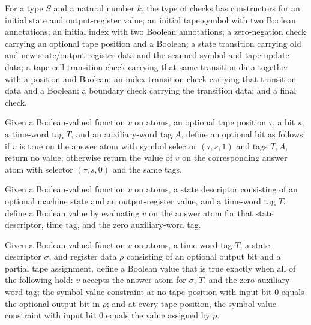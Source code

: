 \begin{definition}
\label{Complexity.Meyer.Check}
\leanok
{}
For a type $S$ and a natural number $k$, the type of checks has constructors for an
initial state and output-register value; an initial tape symbol with two Boolean
annotations; an initial index with two Boolean annotations; a zero-negation check
carrying an optional tape position and a Boolean; a state transition carrying old and
new state/output-register data and the scanned-symbol and tape-update data; a tape-cell
transition check carrying that same transition data together with a position and
Boolean; an index transition check carrying that transition data and a Boolean; a
boundary check carrying the transition data; and a final check.
\end{definition}

\begin{definition}
\label{Complexity.Meyer.symvA}
\leanok
{}
Given a Boolean-valued function $v$ on atoms, an optional tape position $\tau$, a bit
$s$, a time-word tag $T$, and an auxiliary-word tag $A$, define an optional bit as
follows: if $v$ is true on the answer atom with symbol selector $(\tau,s,1)$ and tags
$T,A$, return no value; otherwise return the value of $v$ on the corresponding answer
atom with selector $(\tau,s,0)$ and the same tags.
\end{definition}

\begin{definition}
\label{Complexity.Meyer.stA}
\leanok
{}
Given a Boolean-valued function $v$ on atoms, a state descriptor consisting of an
optional machine state and an output-register value, and a time-word tag $T$, define a
Boolean value by evaluating $v$ on the answer atom for that state descriptor, time tag,
and the zero auxiliary-word tag.
\end{definition}

\begin{definition}
\label{Complexity.Meyer.claims}
\leanok
{}
Given a Boolean-valued function $v$ on atoms, a time-word tag $T$, a state descriptor
$\sigma$, and register data $\rho$ consisting of an optional output bit and a partial
tape assignment, define a Boolean value that is true exactly when all of the following
hold: $v$ accepts the answer atom for $\sigma$, $T$, and the zero auxiliary-word tag;
the symbol-value constraint at no tape position with input bit $0$ equals the optional
output bit in $\rho$; and at every tape position, the symbol-value constraint with input
bit $0$ equals the value assigned by $\rho$.
\end{definition}

